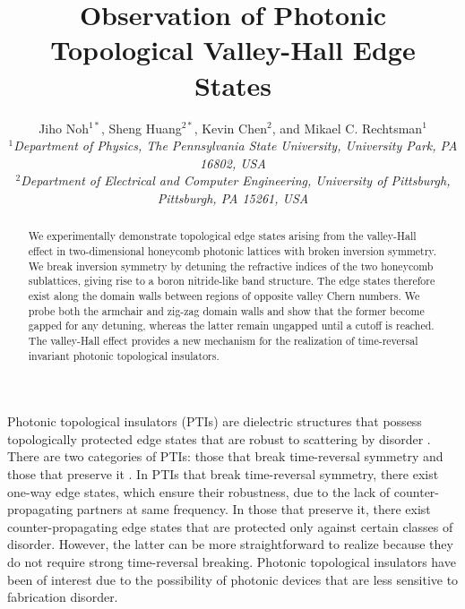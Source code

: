 \documentclass[prl,twocolumn,showpacs,amsmath,amssymb,superscriptaddress]{revtex4-1}
\begin{document}
\title{Observation of Photonic Topological Valley-Hall Edge States}

\author{Jiho Noh$^{1*}$, Sheng Huang$^{2*}$, Kevin Chen$^{2}$, and Mikael C. Rechtsman$^{1}$\\
  {{\it 
$^{1}$Department of Physics, The Pennsylvania State University, University Park, PA 16802, USA\\$^{2}$Department of Electrical and Computer Engineering, University of Pittsburgh, Pittsburgh, PA 15261, USA\\
}}}

\begin{abstract}
We experimentally demonstrate topological edge states arising from the valley-Hall effect in two-dimensional honeycomb photonic lattices with broken inversion symmetry. We break inversion symmetry by detuning the refractive indices of the two honeycomb sublattices, giving rise to a boron nitride-like band structure. The edge states therefore exist along the domain walls between regions of opposite valley Chern numbers. We probe both the armchair and zig-zag domain walls and show that the former become gapped for any detuning, whereas the latter remain ungapped until a cutoff is reached. The valley-Hall effect provides a new mechanism for the realization of time-reversal invariant photonic topological insulators.
\end{abstract}


\maketitle
Photonic topological insulators (PTIs) are dielectric structures that possess topologically protected edge states that are robust to scattering by disorder \cite{Lu2014,Haldane2008,Wang2009,Carusotto2011,Hafezi2011,Fang2012,Rechtsman2013,Hafezi2013,Khanikaev2013,cheng2016robust,Wu2015,Gao2016}. There are two categories of PTIs: those that break time-reversal symmetry \cite{Wang2009,Rechtsman2013} and those that preserve it \cite{Hafezi2013,Khanikaev2013,Wu2015}.
In PTIs that break time-reversal symmetry, there exist one-way edge states, which ensure their robustness, due to the lack of counter-propagating partners at same frequency.
In those that preserve it, there exist counter-propagating edge states that are protected only against certain classes of disorder.  However, the latter can be more straightforward to realize because they do not require strong time-reversal breaking. Photonic topological insulators have been of interest due to the possibility of photonic devices that are less sensitive to fabrication disorder.
\end{document}
